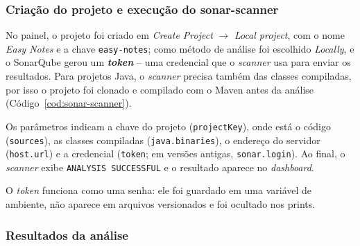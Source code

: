 \subsubsection{Criação do projeto e execução do sonar-scanner}

No painel, o projeto foi criado em \textit{Create Project} $\rightarrow$ \textit{Local project}, com
o nome \textit{Easy Notes} e a chave \texttt{easy-notes}; como método de análise foi escolhido
\textit{Locally}, e o SonarQube gerou um \textbf{\textit{token}} -- uma credencial que o
\textit{scanner} usa para enviar os resultados. Para projetos Java, o \textit{scanner} precisa também
das classes compiladas, por isso o projeto foi clonado e compilado com o Maven antes da análise
(Código~\ref{cod:sonar-scanner}).


Os parâmetros indicam a chave do projeto (\texttt{projectKey}), onde está o código
(\texttt{sources}), as classes compiladas (\texttt{java.binaries}), o endereço do servidor
(\texttt{host.url}) e a credencial (\texttt{token}; em versões antigas, \texttt{sonar.login}). Ao
final, o \textit{scanner} exibe \texttt{ANALYSIS SUCCESSFUL} e o resultado aparece no
\textit{dashboard}.

\begin{atencao}[Token]
  O \textit{token} funciona como uma senha: ele foi guardado em uma variável de ambiente, não aparece
  em arquivos versionados e foi ocultado nos prints.
\end{atencao}

\subsubsection{Resultados da análise}

